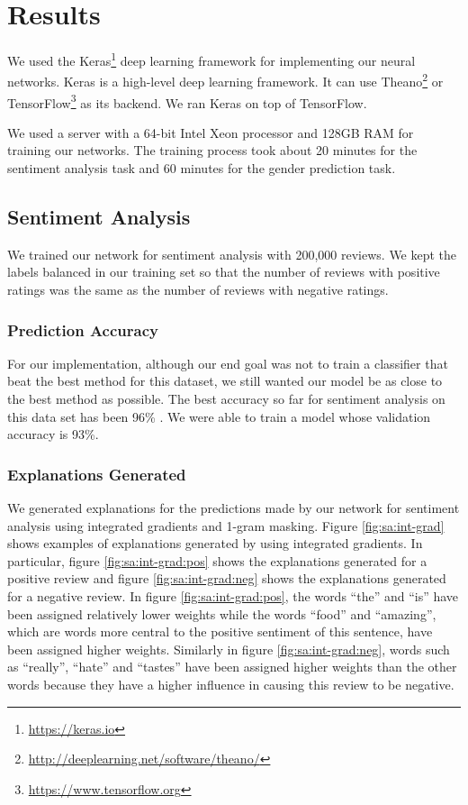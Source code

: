 \section{Results}

We used the Keras\footnote{\url{https://keras.io}} deep learning framework for implementing our neural networks. Keras is a high-level deep learning framework. It can use Theano\footnote{\url{http://deeplearning.net/software/theano/}} or TensorFlow\footnote{\url{https://www.tensorflow.org}} as its backend. We ran Keras on top of TensorFlow.

We used a server with a 64-bit Intel Xeon processor and 128GB RAM for training our networks. The training process took about 20 minutes for the sentiment analysis task and 60 minutes for the gender prediction task.

\subsection{Sentiment Analysis}

We trained our network for sentiment analysis with 200,000 reviews. We kept the labels balanced in our training set so that the number of reviews with positive ratings was the same as the number of reviews with negative ratings.

\subsubsection{Prediction Accuracy}

For our implementation, although our end goal was not to train a classifier that beat the best method for this dataset, we still wanted our model be as close to the best method as possible. The best accuracy so far for sentiment analysis on this data set has been 96\% \cite{Tang2015}. We were able to train a model whose validation accuracy is 93\%.

\subsubsection{Explanations Generated}

We generated explanations for the predictions made by our network for sentiment analysis using integrated gradients and 1-gram masking. Figure \ref{fig:sa:int-grad} shows examples of explanations generated by using integrated gradients. In particular, figure \ref{fig:sa:int-grad:pos} shows the explanations generated for a positive review and figure \ref{fig:sa:int-grad:neg} shows the explanations generated for a negative review. In figure \ref{fig:sa:int-grad:pos}, the words ``the'' and ``is'' have been assigned relatively lower weights while the words ``food'' and ``amazing'', which are words more central to the positive sentiment of this sentence, have been assigned higher weights. Similarly in figure \ref{fig:sa:int-grad:neg}, words such as ``really'', ``hate'' and ``tastes'' have been assigned higher weights than the other words because they 
have a higher influence in causing this review to be negative.


